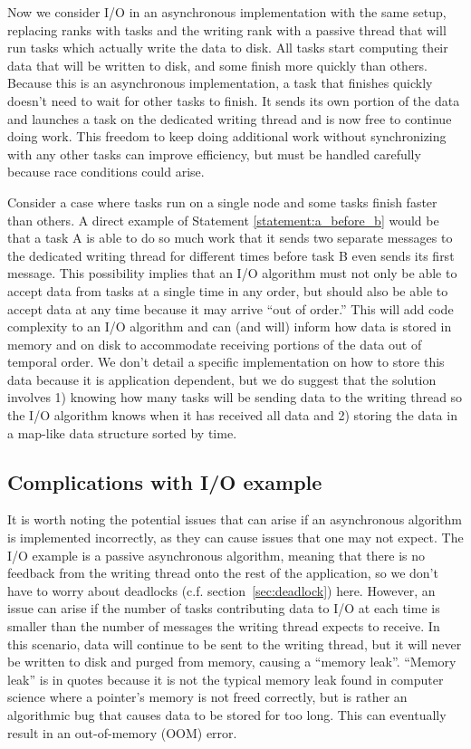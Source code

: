 \begin{bibunit}[unsrtnat]
Now we consider I/O in an asynchronous implementation with the same setup,
replacing ranks with tasks and the writing rank with a passive thread that will
run tasks which actually write the data to disk. All tasks start computing their
data that will be written to disk, and some finish more quickly than others.
Because this is an asynchronous implementation, a task that finishes quickly
doesn't need to wait for other tasks to finish. It sends its own portion of the
data and launches a task on the dedicated writing thread and is now free to
continue doing work. This freedom to keep doing additional work without
synchronizing with any other tasks can improve efficiency, but must be handled
carefully because race conditions could arise.

Consider a case where tasks run on a single node and some tasks finish faster
than others. A direct example of Statement \ref{statement:a_before_b} would be
that a task A is able to do so much work that it sends two separate messages to
the dedicated writing thread for different times before task B even sends its first
message. This possibility implies that an I/O algorithm must not only be able to
accept data from tasks at a single time in any order, but should also be able to
accept data at any time because it may arrive ``out of order.'' This will add
code complexity to an I/O algorithm and can (and will) inform how data is stored
in memory and on disk to accommodate receiving portions of the data out of
temporal order. We don't detail a specific implementation on how to store this
data because it is application dependent, but we do suggest that the solution
involves 1) knowing how many tasks will be sending data to the writing thread
so the I/O algorithm knows when it has received all data and 2) storing the data
in a map-like data structure sorted by time.

\subsection{Complications with I/O example\label{sec:io-complications}}

It is worth noting the potential issues that can arise if an asynchronous
algorithm is implemented incorrectly, as they can cause issues that one may not
expect. The I/O example is a passive asynchronous algorithm, meaning that there
is no feedback from the writing thread onto the rest of the application, so we
don't have to worry about deadlocks (c.f. section~\ref{sec:deadlock}) here.
However, an issue can arise if the number of tasks contributing data to I/O at
each time is smaller than the number of messages the writing thread expects to
receive. In this scenario, data will continue to be sent to the writing thread,
but it will never be written to disk and purged from memory, causing a ``memory
leak''. ``Memory leak'' is in quotes because it is not the typical memory leak
found in computer science where a pointer's memory is not freed correctly, but
is rather an algorithmic bug that causes data to be stored for too long. This
can eventually result in an out-of-memory (OOM) error.


\end{bibunit}

